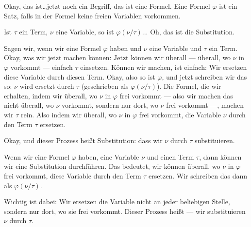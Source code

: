 \begin{spoken-clean}[01:12:22 - 01:14:07]
Okay, das ist\dots jetzt noch ein Begriff, das ist eine Formel. Eine Formel $\varphi$ ist ein Satz, falls in der Formel keine freien Variablen vorkommen.

Ist $\tau$ ein Term, $\nu$ eine Variable, so ist $\varphi(\nu/\tau)$... Oh, das ist die Substitution. 

Sagen wir, wenn wir eine Formel $\varphi$ haben und $\nu$ eine Variable und $\tau$ ein Term. Okay, was wir jetzt machen können: Jetzt können wir überall --- überall, wo $\nu$ in $\varphi$ vorkommt --- einfach $\tau$ einsetzen. Können wir machen, ist einfach: Wir ersetzen diese Variable durch diesen Term. Okay, also so ist $\varphi$, und jetzt schreiben wir das so: $\nu$ wird ersetzt durch $\tau$ (geschrieben als $\varphi(\nu/\tau)$). Die Formel, die wir erhalten, indem wir überall, wo $\nu$ in $\varphi$ frei vorkommt --- also wir machen das nicht überall, wo $\nu$ vorkommt, sondern nur dort, wo $\nu$ frei vorkommt ---, machen wir $\tau$ rein. Also indem wir überall, wo $\nu$ in $\varphi$ frei vorkommt, die Variable $\nu$ durch den Term $\tau$ ersetzen.

Okay, und dieser Prozess heißt Substitution: dass wir $\nu$ durch $\tau$ substituieren.
\end{spoken-clean}
\begin{ai-note}[Substitution]
Wenn wir eine Formel $\varphi$ haben, eine Variable $\nu$ und einen Term $\tau$, dann können wir eine Substitution durchführen. Das bedeutet, wir können überall, wo $\nu$ in $\varphi$ frei vorkommt, diese Variable durch den Term $\tau$ ersetzen. Wir schreiben das dann als $\varphi(\nu/\tau)$.

Wichtig ist dabei: Wir ersetzen die Variable nicht an jeder beliebigen Stelle, sondern nur dort, wo sie frei vorkommt. Dieser Prozess heißt  --- wir substituieren $\nu$ durch $\tau$.
\end{ai-note}

\begin{math-stroke}
\end{math-stroke}

\begin{math-stroke}
\end{math-stroke}

